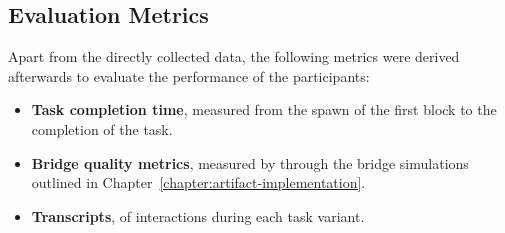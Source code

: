 \subsection{Evaluation Metrics}\label{subsec:evaluation-metrics}
Apart from the directly collected data, the following metrics were derived afterwards to evaluate the performance of the participants:
\begin{itemize}
    \item \textbf{Task completion time}\label{subsec:task-completion-time}, measured from the spawn of the first block to the completion of the task.
    \item \textbf{Bridge quality metrics}\label{subsec:bridge-quality}, measured by through the bridge simulations outlined in Chapter~\ref{chapter:artifact-implementation}.
    \item \textbf{Transcripts}\label{subsec:transcripts}, of interactions during each task variant.
\end{itemize}
